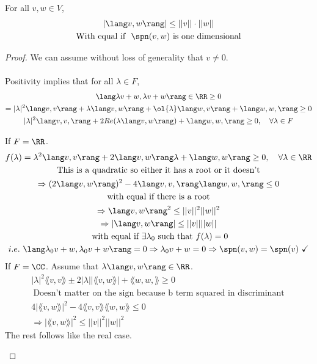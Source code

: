 \documentclass[class=scrartcl, crop=false]{standalone}
\begin{document}
\begin{theorem}
  For all $v, w \in V$,
  \begin{gather*}
    |\lang v, w \rang | \leq ||v|| \cdot ||w||
    \\
    \ \text{With equal if } \ \spn(v, w) \ \text{is one dimensional} \ 
  \end{gather*} 
  \begin{proof}
    We can assume without loss of generality that $v \neq 0$.
    \\\\
    Positivity implies that for all $\lambda \in F$,
    \begin{gather*} %
      \lang \lambda v + w, \lambda v + w \rang \in \RR \geq 0 \\
      = |\lambda|^2\lang v, v \rang + \lambda \lang v, w \rang + \ol{\lambda}\lang w, v \rang + \lang w, w, \rang \geq 0 \\
      |\lambda|^2 \lang v, v, \rang + 2 Re(\lambda \lang v, w \rang ) + \lang w, w, \rang \geq 0, \quad \forall \lambda \in F
    \end{gather*} 
    \begin{enumerate}
      \ii
      If $F = \RR$.
      \begin{gather*}
        f(\lambda) = \lambda^2 \lang v, v \rang + 2 \lang v, w \rang \lambda + \lang w, w \rang \geq 0, \quad \forall \lambda \in \RR \\
        \ \text{This is a quadratic so either it has a root or it doesn't} \ 
        \\
        \Rightarrow (2 \lang v, w \rang )^2 - 4 \lang v, v, \rang \lang w, w, \rang \leq 0 \\
        \ \text{with equal if there is a root} \ 
        \\
        \Rightarrow \lang v, w \rang ^2 \leq ||v||^2||w||^2 \\
        \Rightarrow |\lang v, w \rang | \leq ||v||||w|| \\
        \ \text{with equal if} \ \exists \lambda_0 \ \text{such that} \ f(\lambda) = 0 \\
        i.e. \ \lang \lambda_0 v + w, \lambda_0v + w \rang = 0 \Rightarrow 
        \lambda_0v + w = 0 \Rightarrow \spn(v, w) = \spn(v) \ \checkmark
      \end{gather*} 
      \ii
      If $F = \CC$. Assume that $\lambda \lang v, w \rang \in \RR$.
      \begin{gather*}
        |\lambda|^2 \lang v, v \rang \pm 2 |\lambda|| \lang v, w \rang | + \lang w, w, \rang \geq 0
        \\
        \ \text{Doesn't matter on the sign because b term squared in discriminant} \ 
        \\
        4| \lang v, w \rang |^2 - 4 \lang v, v \rang \lang w, w \rang \leq 0 \\
        \Rightarrow |\lang v, w \rang |^2 \leq ||v||^2||w||^2
      \end{gather*} 
      The rest follows like the real case.
    \end{enumerate} 
  \end{proof} 
\end{theorem} 
\end{document}
